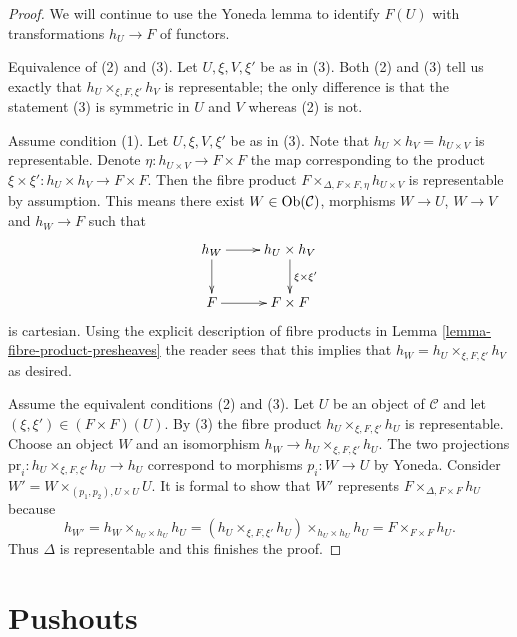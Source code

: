 \begin{proof}
We will continue to use the Yoneda lemma to identify $F(U)$
with transformations $h_U \to F$ of functors.

\medskip\noindent
Equivalence of (2) and (3). Let $U, \xi, V, \xi'$ be as in (3).
Both (2) and (3) tell us exactly that $h_U \times_{\xi, F, \xi'} h_V$
is representable; the only difference is that the statement
(3) is symmetric in $U$ and $V$ whereas (2) is not.

\medskip\noindent
Assume condition (1). Let $U, \xi, V, \xi'$
be as in (3). Note that $h_U \times h_V = h_{U \times V}$ is representable.
Denote $\eta : h_{U \times V} \to F \times F$ the map
corresponding to the product $\xi \times \xi' : h_U \times h_V \to F \times F$.
Then the fibre product $F \times_{\Delta, F \times F, \eta} h_{U \times V}$
is representable by assumption. This means there exist
$W \in \mathop{\mathrm{Ob}}\nolimits(\mathcal{C})$, morphisms
$W \to U$, $W \to V$ and $h_W \to F$ such that
$$
\xymatrix{
h_W \ar[d] \ar[r] & h_U \times h_V \ar[d]^{\xi \times \xi'} \\
F \ar[r] & F \times F
}
$$
is cartesian. Using the explicit description of fibre products
in Lemma \ref{lemma-fibre-product-presheaves} the reader sees that this
implies that $h_W = h_U \times_{\xi, F, \xi'} h_V$ as desired.

\medskip\noindent
Assume the equivalent conditions (2) and (3). Let $U$ be an object
of $\mathcal{C}$ and let $(\xi, \xi') \in (F \times F)(U)$.
By (3) the fibre product $h_U \times_{\xi, F, \xi'} h_U$ is
representable. Choose an object $W$ and an isomorphism
$h_W \to h_U \times_{\xi, F, \xi'} h_U$. The two projections
$\text{pr}_i : h_U \times_{\xi, F, \xi'} h_U \to h_U$
correspond to morphisms $p_i : W \to U$ by Yoneda. Consider
$W' = W \times_{(p_1, p_2), U \times U} U$. It is formal
to show that $W'$ represents $F \times_{\Delta, F \times F} h_U$
because
$$
h_{W'} = h_W \times_{h_U \times h_U} h_U
= (h_U \times_{\xi, F, \xi'} h_U) \times_{h_U \times h_U} h_U
= F \times_{F \times F} h_U.
$$
Thus $\Delta$ is representable and this finishes the proof.
\end{proof}









\section{Pushouts}
\label{section-pushouts}

